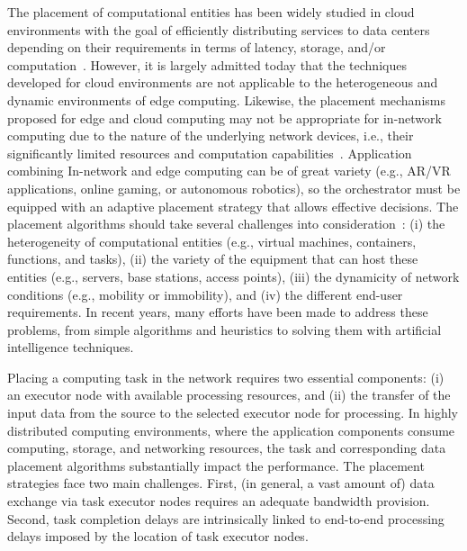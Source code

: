 \noindent The placement of computational entities has been widely studied in cloud environments with the goal of efficiently distributing services to data centers depending on their requirements in terms of latency, storage, and/or computation~\cite{cloud1}. However, it is largely admitted today that the techniques developed for cloud environments are not applicable to the heterogeneous and dynamic environments of edge computing. Likewise, the placement mechanisms proposed for edge and cloud computing may not be appropriate for in-network computing due to the nature of the underlying network devices, i.e., their significantly limited resources and computation capabilities~\cite{placeDelayINC, distributedINC}.
Application combining In-network and edge computing can be of great variety (e.g., AR/VR applications, online gaming, or autonomous robotics), so the orchestrator must be equipped with an adaptive placement strategy that allows effective decisions. The placement algorithms should take several challenges into consideration~\cite{placementSurvey}: (i) the heterogeneity of computational entities (e.g., virtual machines, containers, functions, and tasks), (ii) the variety of the equipment that can host these entities (e.g., servers, base stations, access points), (iii) the dynamicity of network conditions (e.g., mobility or immobility), and (iv) the different end-user requirements. In recent years, many efforts have been made to address these problems, from simple algorithms and heuristics to solving them with artificial intelligence techniques.

Placing a computing task in the network requires two essential components: (i) an executor node with available processing resources, and (ii) the transfer of the input data from the source to the selected executor node for processing. In highly distributed computing environments, where the application components consume computing, storage, and networking resources, the task and corresponding data placement algorithms substantially impact the performance. The placement strategies face two main challenges. First, (in general, a vast amount of) data exchange  via task executor nodes requires an adequate bandwidth provision. Second, task completion delays are intrinsically linked to end-to-end processing delays imposed by the location of task executor nodes.

